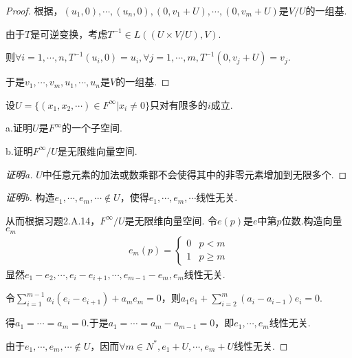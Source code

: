 \begin{proof}
    根据，\((u_1,0),\cdots,(u_n,0),(0,v_1+U),\cdots,(0,v_m+U)\)是\(V/U\)的一组基.

    由于\(T\)是可逆变换，考虑\(T^{-1} \in L((U \times V/U),V)\).

    则\(\forall i=1,\cdots,n,T^{-1}(u_i,0)=u_i,\forall j=1,\cdots,m,T^{-1}(0,v_j+U)=v_j\).

    于是\(v_1,\cdots,v_m,u_1,\cdots,u_n\)是\(V\)的一组基.
\end{proof}

\newpage

\begin{problem}[14]\label{3.E.14}
    设\(U=\{(x_1,x_2,\cdots)\in F^\infty | x_i \ne 0\}\)只对有限多的\(i\)成立.

    a.证明\(U\)是\(F^\infty\)的一个子空间.

    b.证明\(F^\infty /U\)是无限维向量空间.
\end{problem}

\begin{proof}[证明a]
    \(U\)中任意元素的加法或数乘都不会使得其中的非零元素增加到无限多个.
\end{proof}

\begin{proof}[证明b]
    构造\(e_1,\cdots,e_m,\cdots \notin U\)，使得\(e_1,\cdots,e_m,\cdots\)线性无关.

    从而根据习题2.A.14，\(F^\infty /U\)是无限维向量空间.
    令\(e(p)\)是\(e\)中第\(p\)位数.构造向量\(e_m\)
    \begin{align*}
        e_m(p)=
            \begin{cases}
                0 & p<m \\
                1 & p \geq m
            \end{cases}
    \end{align*}
    显然\(e_1-e_2,\cdots,e_i-e_{i+1},\cdots,e_{m-1}-e_m,e_m\)线性无关.
    
    令\(\sum_{i=1}^{m-1} a_i(e_i-e_{i+1})+a_me_m=0\)，则\(a_1e_1+\sum_{i=2}^m(a_i-a_{i-1})e_i=0\).
    
    得\(a_1=\cdots=a_m=0\).于是\(a_1=\cdots=a_m-a_{m-1}=0\)，即\(e_1,\cdots,e_m\)线性无关.
    
    由于\(e_1,\cdots,e_m,\cdots \notin U\)，因而\(\forall m \in N^*,e_1+U,\cdots,e_m+U\)线性无关.
\end{proof}

